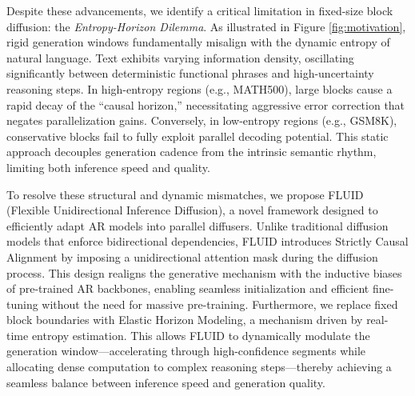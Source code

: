 \documentclass[11pt]{article}
\begin{document}
Despite these advancements, we identify a critical limitation in fixed-size block diffusion: the \textit{Entropy-Horizon Dilemma}. 
As illustrated in Figure \ref{fig:motivation}, rigid generation windows fundamentally misalign with the dynamic entropy of natural language. Text exhibits varying information density, oscillating significantly between deterministic functional phrases and high-uncertainty reasoning steps.
In high-entropy regions (e.g., MATH500), large blocks cause a rapid decay of the ``causal horizon,'' necessitating aggressive error correction that negates parallelization gains. Conversely, in low-entropy regions (e.g., GSM8K), conservative blocks fail to fully exploit parallel decoding potential. This static approach decouples generation cadence from the intrinsic semantic rhythm, limiting both inference speed and quality.


To resolve these structural and dynamic mismatches, we propose FLUID (Flexible Unidirectional Inference Diffusion), a novel framework designed to efficiently adapt AR models into parallel diffusers. Unlike traditional diffusion models that enforce bidirectional dependencies, FLUID introduces Strictly Causal Alignment by imposing a unidirectional attention mask during the diffusion process. This design realigns the generative mechanism with the inductive biases of pre-trained AR backbones, enabling seamless initialization and efficient fine-tuning without the need for massive pre-training. Furthermore, we replace fixed block boundaries with Elastic Horizon Modeling, a mechanism driven by real-time entropy estimation. This allows FLUID to dynamically modulate the generation window—accelerating through high-confidence segments while allocating dense computation to complex reasoning steps—thereby achieving a seamless balance between inference speed and generation quality.





    
\end{document}
